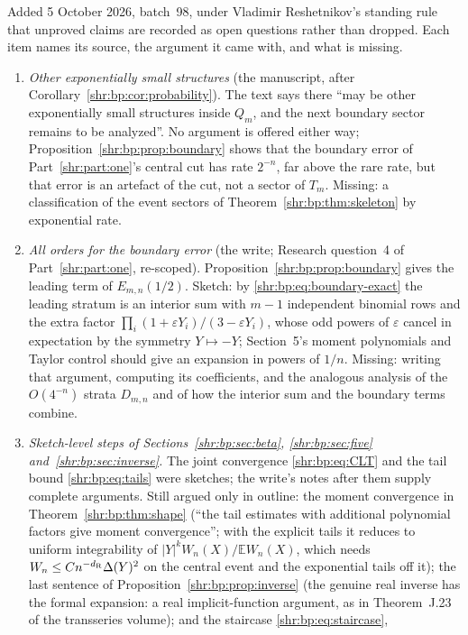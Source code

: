 \documentclass[11pt,letterpaper]{article}
\numberwithin{equation}{section}
\theoremstyle{definition}
\newcommand{\E}{\mathbb E}
\newcommand{\1}{\mathbf 1}
\newcommand{\eps}{\varepsilon}
\begin{document}
Added 5 October 2026, batch~98, under Vladimir Reshetnikov's standing rule
that unproved claims are recorded as open questions rather than dropped.
Each item names its source, the argument it came with, and what is
missing.
\begin{enumerate}[label=(F\arabic*),leftmargin=*]
\item \emph{Other exponentially small structures} (the manuscript, after
Corollary~\ref{shr:bp:cor:probability}). The text says there ``may be
other exponentially small structures inside $Q_m$, and the next boundary
sector remains to be analyzed''. No argument is offered either way;
Proposition~\ref{shr:bp:prop:boundary} shows that the boundary error of
Part~\ref{shr:part:one}'s central cut has rate $2^{-n}$, far above the
rare rate, but that error is an artefact of the cut, not a sector of
$T_m$. Missing: a classification of the event sectors of
Theorem~\ref{shr:bp:thm:skeleton} by exponential rate.
\item \emph{All orders for the boundary error} (the write;
Research question~4 of Part~\ref{shr:part:one}, re-scoped).
Proposition~\ref{shr:bp:prop:boundary} gives the leading term of
$E_{m,n}(1/2)$. Sketch: by \eqref{shr:bp:eq:boundary-exact} the leading
stratum is an interior sum with $m-1$ independent binomial rows and the
extra factor $\prod_i(1+\eps Y_i)/(3-\eps Y_i)$, whose odd powers of
$\eps$ cancel in expectation by the symmetry $Y\mapsto-Y$; Section~5's
moment polynomials and Taylor control should give an expansion in powers
of $1/n$. Missing: writing that argument, computing its coefficients, and
the analogous analysis of the $O(4^{-n})$ strata $D_{m,n}$ and of how the
interior sum and the boundary terms combine.
\item \emph{Sketch-level steps of Sections~\ref{shr:bp:sec:beta},
\ref{shr:bp:sec:five} and~\ref{shr:bp:sec:inverse}.} The joint convergence
\eqref{shr:bp:eq:CLT} and the tail bound \eqref{shr:bp:eq:tails} were
sketches; the write's notes after them supply complete arguments. Still
argued only in outline: the moment convergence in
Theorem~\ref{shr:bp:thm:shape} (``the tail estimates with additional
polynomial factors give moment convergence''; with the explicit tails it
reduces to uniform integrability of $|Y|^kW_n(X)/\E W_n(X)$, which needs
$W_n\le Cn^{-d_{\rm R}}\Delta(Y)^2$ on the central event and the
exponential tails off it); the last sentence of
Proposition~\ref{shr:bp:prop:inverse} (the genuine real inverse has the
formal expansion: a real implicit-function argument, as in Theorem~J.23 of
the transseries volume); and the staircase \eqref{shr:bp:eq:staircase},

\end{enumerate}
\end{document}
